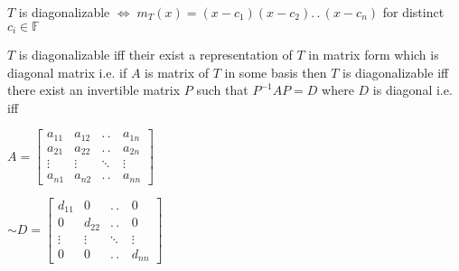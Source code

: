 \documentclass[11pt]{extarticle}
\newcommand{\F}{\mathbb{F}}
\newcommand{\ck}{.\,.\,}
\newcommand{\tbx}[2][]{
	\begin{tcolorbox}[enhanced,breakable,size=small,colback=black!2!white,title={#1},arc is angular, arc=1.5mm,drop fuzzy shadow]
		#2
	\end{tcolorbox}
}
\begin{document}
\begin{multicols}{2}
{$ T $ is diagonalizable $ \iff \; m_T(x)=(x-c_1)(x-c_2)\ck(x-c_n) $ for distinct $ c_i\in \F $ }
\tbx[matrix representation]{
$ T $ is diagonalizable iff their exist a representation of $ T $ in matrix form which is diagonal matrix i.e.
if $ A $ is matrix of $ T $ in some basis then $ T $ is diagonalizable iff there exist an invertible matrix $ P $ such that $  P^{-1}  AP=D $ where $ D $ is diagonal i.e. iff }
\newcolumn
\begin{flushleft}
	$ A=\begin{bmatrix}
		a_{11} & a_{12} & \ck & a_{1n}\\
		a_{21} & a_{22}& \ck & a_{2n}\\
		\vdots & \vdots & \ddots &\vdots\\
		a_{n1}& a_{n2}&\ck & a_{nn} 
	\end{bmatrix}  $
\end{flushleft}
\begin{flushright}
$ 
\sim D=
\begin{bmatrix}
	d_{11} & 0 & \ck & 0\\
	0& d_{22}& \ck & 0\\
	\vdots & \vdots & \ddots &\vdots\\
	0& 0&\ck & d_{nn} 
\end{bmatrix}  $
\end{flushright} 


\end{multicols}
\end{document}
